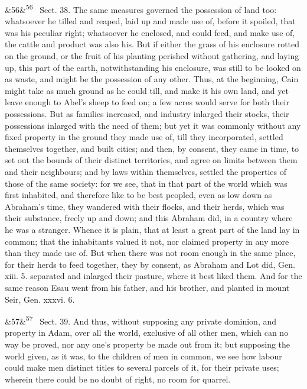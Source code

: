 \documentclass[12pt]{article}
\newcommand{\para}[1][]{\par\noindent\ifx&#1&\else\textsuperscript{\footnotesize #1}~\fi}
\begin{document}
\para[56] Sect. 38. The same measures governed the possession of land too: whatsoever he tilled and reaped, laid up and made use of, before it spoiled, that was his peculiar right; whatsoever he enclosed, and could feed, and make use of, the cattle and product was also his. But if either the grass of his enclosure rotted on the ground, or the fruit of his planting perished without gathering, and laying up, this part of the earth, notwithstanding his enclosure, was still to be looked on as waste, and might be the possession of any other. Thus, at the beginning, Cain might take as much ground as he could till, and make it his own land, and yet leave enough to Abel's sheep to feed on; a few acres would serve for both their possessions. But as families increased, and industry inlarged their stocks, their possessions inlarged with the need of them; but yet it was commonly without any fixed property in the ground they made use of, till they incorporated, settled themselves together, and built cities; and then, by consent, they came in time, to set out the bounds of their distinct territories, and agree on limits between them and their neighbours; and by laws within themselves, settled the properties of those of the same society: for we see, that in that part of the world which was first inhabited, and therefore like to be best peopled, even as low down as Abraham's time, they wandered with their flocks, and their herds, which was their substance, freely up and down; and this Abraham did, in a country where he was a stranger. Whence it is plain, that at least a great part of the land lay in common; that the inhabitants valued it not, nor claimed property in any more than they made use of. But when there was not room enough in the same place, for their herds to feed together, they by consent, as Abraham and Lot did, Gen. xiii. 5. separated and inlarged their pasture, where it best liked them. And for the same reason Esau went from his father, and his brother, and planted in mount Seir, Gen. xxxvi. 6.

\para[57] Sect. 39. And thus, without supposing any private dominion, and property in Adam, over all the world, exclusive of all other men, which can no way be proved, nor any one's property be made out from it; but supposing the world given, as it was, to the children of men in common, we see how labour could make men distinct titles to several parcels of it, for their private uses; wherein there could be no doubt of right, no room for quarrel.
\end{document}
